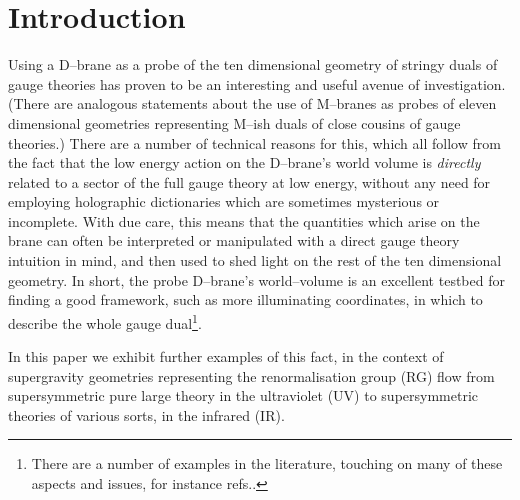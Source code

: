 \documentclass[a4paper,12pt]{article}
\begin{document}
  
\section{Introduction}
 
Using a D--brane as a probe of the ten dimensional geometry of stringy
duals\cite{malda, gkp, w1} of gauge theories has proven to be an
interesting and useful avenue of investigation. (There are analogous
statements about the use of M--branes as probes of eleven dimensional
geometries representing M--ish duals of close cousins of gauge
theories.)  There are a number of technical reasons for this, which
all follow from the fact that the low energy action on the D--brane's
world volume is {\it directly} related to a sector of the full gauge
theory at low energy, without any need for employing holographic
dictionaries which are sometimes mysterious or incomplete.  With due
care, this means that the quantities which arise on the brane can
often be interpreted or manipulated with a direct gauge theory
intuition in mind, and then used to shed light on the rest of the ten
dimensional geometry. In short, the probe D--brane's world--volume is
an excellent testbed for finding a good framework, such as more
illuminating coordinates, in which to describe the whole gauge
dual\footnote{There are a number of examples in the literature,
  touching on many of these aspects and issues, for instance
  refs.\cite{bpp,ejp,beh,primer}.}.

In this paper we exhibit further examples of this fact, in the context
of supergravity geometries representing the renormalisation group (RG)
flow\cite{gppz1, dz1} from \coordHE{} supersymmetric pure large \coordHE{}  \coordHE{} theory in the ultraviolet (UV) to
supersymmetric theories of various sorts, in the infrared (IR).
 
\end{document}
